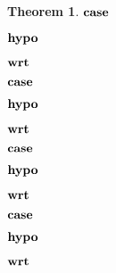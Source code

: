 \documentclass[acmsmall]{acmart}
\theoremstyle{definition}
\newtheorem{theorem}{Theorem}[section]
\begin{document}
\begin{theorem}
    \item \Z $\textbf{case } $
    \item \Z $\textbf{hypo } $
    \item \Z $\textbf{wrt } $
      \item \Z\Z {} 

    \item \Z $\textbf{case } $
    \item \Z $\textbf{hypo } $
    \item \Z $\textbf{wrt } $
      \item \Z\Z {} 

    \item \Z $\textbf{case } $
    \item \Z $\textbf{hypo } $
    \item \Z $\textbf{wrt } $

      \item \Z\Z {} 

    \item \Z $\textbf{case } $
    \item \Z $\textbf{hypo } $
    \item \Z $\textbf{wrt } $
      \item \Z\Z {} 


\end{theorem}
\end{document}
